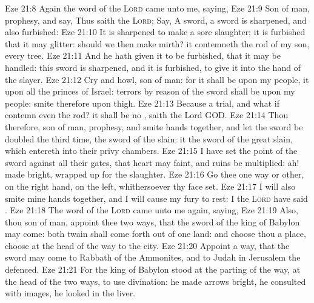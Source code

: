 \vs Eze 21:8 Again the word of the \textsc{Lord} came unto me, saying,
\vs Eze 21:9 Son of man, prophesy, and say, Thus saith the \textsc{Lord}; Say, A sword, a sword is sharpened, and also furbished:
\vs Eze 21:10 It is sharpened to make a sore slaughter; it is furbished that it may glitter: should we then make mirth? it contemneth the rod of my son,  every tree.
\vs Eze 21:11 And he hath given it to be furbished, that it may be handled: this sword is sharpened, and it is furbished, to give it into the hand of the slayer.
\vs Eze 21:12 Cry and howl, son of man: for it shall be upon my people, it  upon all the princes of Israel: terrors by reason of the sword shall be upon my people: smite therefore upon  thigh.
\vs Eze 21:13 Because  a trial, and what if  contemn even the rod? it shall be no , saith the Lord GOD.
\vs Eze 21:14 Thou therefore, son of man, prophesy, and smite  hands together, and let the sword be doubled the third time, the sword of the slain: it  the sword of the great  slain, which entereth into their privy chambers.
\vs Eze 21:15 I have set the point of the sword against all their gates, that  heart may faint, and  ruins be multiplied: ah!  made bright,  wrapped up for the slaughter.
\vs Eze 21:16 Go thee one way or other,  on the right hand,  on the left, whithersoever thy face  set.
\vs Eze 21:17 I will also smite mine hands together, and I will cause my fury to rest: I the \textsc{Lord} have said .
\vs Eze 21:18 The word of the \textsc{Lord} came unto me again, saying,
\vs Eze 21:19 Also, thou son of man, appoint thee two ways, that the sword of the king of Babylon may come: both twain shall come forth out of one land: and choose thou a place, choose  at the head of the way to the city.
\vs Eze 21:20 Appoint a way, that the sword may come to Rabbath of the Ammonites, and to Judah in Jerusalem the defenced.
\vs Eze 21:21 For the king of Babylon stood at the parting of the way, at the head of the two ways, to use divination: he made  arrows bright, he consulted with images, he looked in the liver.
